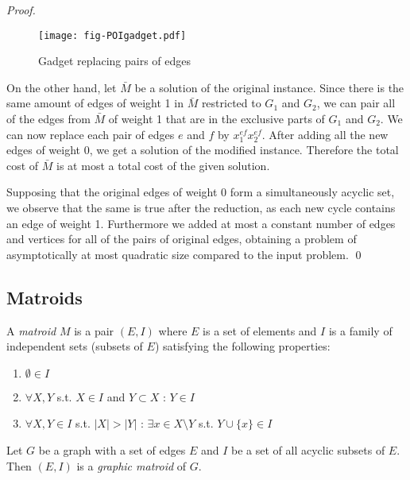 \begin{proof}
\begin{figure}
    \centering
    \texttt{[image: fig-POIgadget.pdf]}
    \caption{Gadget replacing pairs of edges}
    \label{fig:my_label}
\end{figure}

On the other hand, let $\bar{M}$ be a solution of the original instance. Since there is the same amount of edges of weight 1 in $\bar{M}$ restricted to $G_1$ and $G_2$, we can pair all of the edges from $\bar{M}$ of weight 1 that are in the exclusive parts of $G_1$ and $G_2$. We can now replace each pair of edges $e$ and $f$ by $x^{ef}_1x^{ef}_2$. After adding all the new edges of weight 0, we get a solution of the modified instance. Therefore the total cost of $\bar{M}$ is at most a total cost of the given solution. 

Supposing that the original edges of weight 0 form a simultaneously acyclic set, we observe that the same is true after the reduction, as each new cycle contains an edge of weight 1. Furthermore we added at most a constant number of edges and vertices for all of the pairs of original edges, obtaining a problem of asymptotically at most quadratic size compared to the input problem. \qed
\end{proof}

\subsection{Matroids}

\begin{definition}
A {\em matroid} $M$ is a pair $(E,I)$ where $E$ is a set of elements and $I$ is a family of independent sets (subsets of $E$) satisfying the following properties: 

\begin{enumerate}
    \item $\emptyset \in I$ 
    \item $\forall X,Y$ s.t. $ X \in I$ and $ Y \subset X$ : $Y \in I$
    \item $\forall X,Y \in I$ s.t. $|X| > |Y|$ : $\exists x \in X\setminus Y$ s.t. $Y \cup \{x\} \in I$
\end{enumerate}
\end{definition}

\begin{definition}
Let $G$ be a graph with a set of edges $E$ and $I$ be a set of all acyclic subsets of $E$. Then $(E,I)$ is a {\em graphic matroid} of $G$. 
\end{definition}

